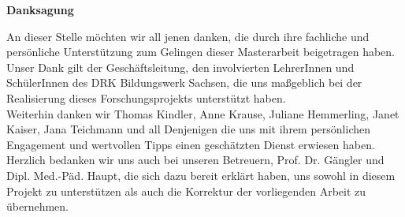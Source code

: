 \vspace*{\fill}
\begin{center}
\textbf{Danksagung}
\end{center}

\noindent 
An dieser Stelle möchten wir all jenen danken, die durch ihre fachliche und persönliche Unterstützung zum Gelingen dieser Masterarbeit beigetragen haben.\\[0,5cm]
Unser Dank gilt der Geschäftsleitung, den involvierten LehrerInnen und SchülerInnen des DRK Bildungswerk Sachsen, die uns maßgeblich bei der Realisierung dieses Forschungsprojekts unterstützt haben.\\[0,5cm]
Weiterhin danken wir Thomas Kindler, Anne Krause, Juliane Hemmerling, Janet Kaiser, Jana Teichmann und all Denjenigen die uns mit ihrem persönlichen Engagement und wertvollen Tipps einen geschätzten Dienst erwiesen haben.\\[0,5cm]
Herzlich bedanken wir uns auch bei unseren Betreuern, Prof. Dr. Gängler und Dipl. Med.-Päd. Haupt, die sich dazu bereit erklärt haben, uns sowohl in diesem Projekt zu unterstützen als auch die Korrektur der vorliegenden Arbeit zu übernehmen.
\vspace{\fill}